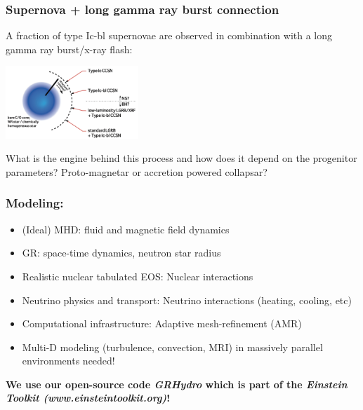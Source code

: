 \documentclass{beamer}
\begin{document}
\begin{frame}
\frametitle{Supernova + long gamma ray burst connection}
\begin{minipage}[]{0.45\textwidth}
A fraction of type Ic-bl supernovae are observed in combination with a long gamma ray burst/x-ray flash: 
\end{minipage} 
\hspace{0.5cm}
\vspace{0.5cm}
\begin{minipage}[]{0.45\textwidth}
\begin{minipage}[]{\textwidth}
\includegraphics[width=5.0cm]{./dial.png}
\end{minipage}
\end{minipage}

\vspace{0.5cm}
\begin{minipage}[]{\textwidth}
What is the engine behind this process and how does it depend on the progenitor parameters? Proto-magnetar or accretion powered collapsar?
\end{minipage}


\end{frame}

\begin{frame}
\frametitle{Modeling:}
\begin{center}
\begin{itemize}
\item (Ideal) MHD: fluid and magnetic field dynamics 
\item GR: space-time dynamics, neutron star radius
\item Realistic nuclear tabulated EOS: Nuclear interactions
\item Neutrino physics and transport: Neutrino interactions (heating, cooling, etc)
\item Computational infrastructure: Adaptive mesh-refinement (AMR)
\item Multi-D modeling (turbulence, convection, MRI) in massively parallel environments needed!
\end{itemize}
\vspace{0.5cm} 
\bf{We use our open-source code \textit{GRHydro} which is part of the \textit{Einstein Toolkit (www.einsteintoolkit.org)}}!
\end{center}
\end{frame}
\end{document}
